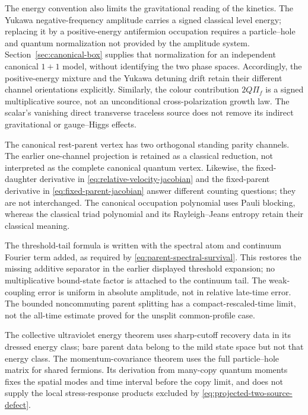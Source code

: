 \documentclass[11pt,a4paper,oneside]{book}
\theoremstyle{plain}
\theoremstyle{definition}
\theoremstyle{remark}
\begin{document}
The energy convention also limits the gravitational reading of the
kinetics.  The Yukawa negative-frequency amplitude carries a signed
classical level energy; replacing it by a positive-energy antifermion
occupation requires a particle--hole and quantum normalization not
provided by the amplitude system.  Section~\ref{sec:canonical-box}
supplies that normalization for an independent canonical $1+1$ model,
without identifying the two phase spaces.  Accordingly, the positive-energy
mixture and the Yukawa detuning drift retain their different channel
orientations explicitly.  Similarly, the colour contribution $2Q\Pi_f$
is a signed multiplicative source, not an unconditional cross-polarization
growth law.  The scalar's vanishing direct transverse traceless source
does not remove its indirect gravitational or gauge--Higgs effects.

The canonical rest-parent vertex has two orthogonal standing parity
channels.  The earlier one-channel projection is retained as a classical
reduction, not interpreted as the complete canonical quantum vertex.
Likewise, the fixed-daughter derivative in
\eqref{eq:relative-velocity-jacobian} and the fixed-parent derivative in
\eqref{eq:fixed-parent-jacobian} answer different counting questions;
they are not interchanged.  The canonical occupation polynomial uses
Pauli blocking, whereas the classical triad polynomial and its
Rayleigh--Jeans entropy retain their classical meaning.

The threshold-tail formula is written with the spectral atom and
continuum Fourier term added, as required by
\eqref{eq:parent-spectral-survival}.  This restores the missing additive
separator in the earlier displayed threshold expansion; no multiplicative
bound-state factor is attached to the continuum tail.  The weak-coupling
error is uniform in absolute amplitude, not in relative late-time error.
The bounded noncommuting parent splitting has a compact-rescaled-time
limit, not the all-time estimate proved for the unsplit common-profile
case.

The collective ultraviolet energy theorem uses sharp-cutoff recovery
data in its dressed energy class; bare parent data belong to the mild
state space but not that energy class.  The momentum-covariance theorem
uses the full particle--hole matrix for shared fermions.  Its derivation
from many-copy quantum moments fixes the spatial modes and time interval
before the copy limit, and does not supply the local stress-response
products excluded by \eqref{eq:projected-two-source-defect}.
\end{document}
